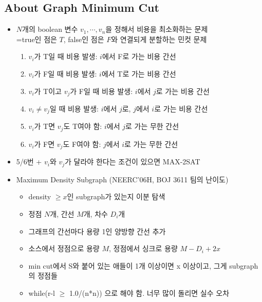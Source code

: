 \documentclass[landscape, 8pt, a4paper, oneside]{extarticle}
\begin{document}
\begin{multicols*}{3}
\subsection{About Graph Minimum Cut}
\begin{itemize}[noitemsep]
    \item $N$개의 boolean 변수 $v_1, \cdots, v_n$을 정해서 비용을 최소화하는 문제\\=true인 점은 $T$, false인 점은 $F$와 연결되게 분할하는 민컷 문제
    \begin{enumerate}[noitemsep]
        \item $v_i$가 T일 때 비용 발생: $i$에서 F로 가는 비용 간선
        \item $v_i$가 F일 때 비용 발생: $i$에서 T로 가는 비용 간선
        \item $v_i$가 T이고 $v_j$가 F일 때 비용 발생: $i$에서 $j$로 가는 비용 간선
        \item $v_i \ne v_j$일 때 비용 발생: $i$에서 $j$로, $j$에서 $i$로 가는 비용 간선
        \item $v_i$가 T면 $v_j$도 T여야 함: $i$에서 $j$로 가는 무한 간선
        \item $v_i$가 F면 $v_j$도 F여야 함: $j$에서 $i$로 가는 무한 간선
    \end{enumerate}
    \item 5/6번 + $v_i$와 $v_j$가 달라야 한다는 조건이 있으면 MAX-2SAT
    \item Maximum Density Subgraph (NEERC'06H, BOJ 3611 팀의 난이도)
    \begin{itemize}[noitemsep]
        \item density $\geq x$인 subgraph가 있는지 이분 탐색
        \item 정점 $N$개, 간선 $M$개, 차수 $D_i$개
        \item 그래프의 간선마다 용량 1인 양방향 간선 추가
        \item 소스에서 정점으로 용량 $M$, 정점에서 싱크로 용량 $M-D_i+2x$
        \item min cut에서 S와 붙어 있는 애들이 1개 이상이면 x 이상이고, 그게 subgraph의 정점들
        \item while(r-l $\geq$ 1.0/(n*n)) 으로 해야 함. 너무 많이 돌리면 실수 오차
    \end{itemize}
\end{itemize}


\end{multicols*}
\end{document}
